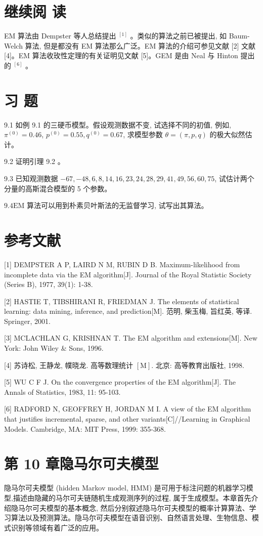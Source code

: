 \documentclass[10pt]{article}
\begin{document}
\section*{继续阅 读}
EM 算法由 Dempster 等人总结提出 ${ }^{[1]}$ 。类似的算法之前已被提出, 如 Baum-Welch 算法, 但是都没有 EM 算法那么广泛。EM 算法的介绍可参见文献 [2] 文献 [4]。EM 算法收玫性定理的有关证明见文献 [5]。GEM 是由 Neal 与 Hinton 提出的 ${ }^{[6]}$ 。

\section*{习 题}
9.1 如例 9.1 的三硬币模型。假设观测数据不变, 试选择不同的初值, 例如, $\pi^{(0)}=0.46$, $p^{(0)}=0.55, q^{(0)}=0.67$, 求模型参数 $\theta=(\pi, p, q)$ 的极大似然估计。

9.2 证明引理 9.2 。

9.3 已知观测数据 $-67,-48,6,8,14,16,23,24,28,29,41,49,56,60,75$, 试估计两个分量的高斯混合模型的 5 个参数。

$9.4 \mathrm{EM}$ 算法可以用到朴素贝叶斯法的无监督学习, 试写出其算法。

\section*{参考文献}
[1] DEMPSTER A P, LAIRD N M, RUBIN D B. Maximum-likelihood from incomplete data via the EM algorithm[J]. Journal of the Royal Statistic Society (Series B), 1977, 39(1): 1-38.

[2] HASTIE T, TIBSHIRANI R, FRIEDMAN J. The elements of statistical learning: data mining, inference, and prediction[M]. 范明, 柴玉梅, 旨红英, 等译. Springer, 2001.

[3] MCLACHLAN G, KRISHNAN T. The EM algorithm and extensions[M]. New York: John Wiley \& Sons, 1996.

[4] 苏诗松, 王静龙, 幞晓龙. 高等数理统计 $[\mathrm{M}]$. 北京: 高等教育出版社, 1998.

[5] WU C F J. On the convergence properties of the EM algorithm[J]. The Annals of Statistics, 1983, 11: 95-103.

[6] RADFORD N, GEOFFREY H, JORDAN M I. A view of the EM algorithm that justifies incremental, sparse, and other variants[C]//Learning in Graphical Models. Cambridge, MA: MIT Press, 1999: 355-368.

\section*{第 10 章隐马尔可夫模型}
隐马尔可夫模型 (hidden Markov model, HMM) 是可用于标注问题的机器学习模型,描述由隐藏的马尔可夫链随机生成观测序列的过程, 属于生成模型。本章首先介绍隐马尔可夫模型的基本概念, 然后分别叙述隐马尔可夫模型的概率计算算法、学习算法以及预测算法。隐马尔可夫模型在语音识别、自然语言处理、生物信息、模式识别等领域有着广泛的应用。
\end{document}
